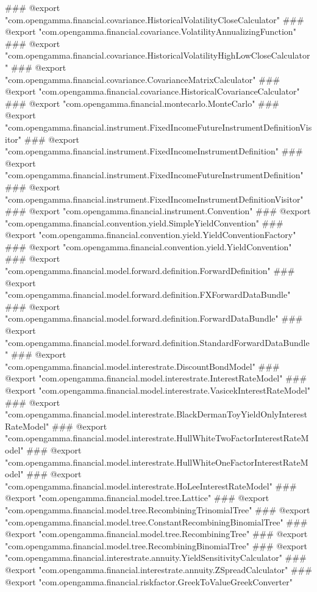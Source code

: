 ### @export "com.opengamma.financial.covariance.HistoricalVolatilityCloseCalculator"
### @export "com.opengamma.financial.covariance.VolatilityAnnualizingFunction"
### @export "com.opengamma.financial.covariance.HistoricalVolatilityHighLowCloseCalculator"
### @export "com.opengamma.financial.covariance.CovarianceMatrixCalculator"
### @export "com.opengamma.financial.covariance.HistoricalCovarianceCalculator"
### @export "com.opengamma.financial.montecarlo.MonteCarlo"
### @export "com.opengamma.financial.instrument.FixedIncomeFutureInstrumentDefinitionVisitor"
### @export "com.opengamma.financial.instrument.FixedIncomeInstrumentDefinition"
### @export "com.opengamma.financial.instrument.FixedIncomeFutureInstrumentDefinition"
### @export "com.opengamma.financial.instrument.FixedIncomeInstrumentDefinitionVisitor"
### @export "com.opengamma.financial.instrument.Convention"
### @export "com.opengamma.financial.convention.yield.SimpleYieldConvention"
### @export "com.opengamma.financial.convention.yield.YieldConventionFactory"
### @export "com.opengamma.financial.convention.yield.YieldConvention"
### @export "com.opengamma.financial.model.forward.definition.ForwardDefinition"
### @export "com.opengamma.financial.model.forward.definition.FXForwardDataBundle"
### @export "com.opengamma.financial.model.forward.definition.ForwardDataBundle"
### @export "com.opengamma.financial.model.forward.definition.StandardForwardDataBundle"
### @export "com.opengamma.financial.model.interestrate.DiscountBondModel"
### @export "com.opengamma.financial.model.interestrate.InterestRateModel"
### @export "com.opengamma.financial.model.interestrate.VasicekInterestRateModel"
### @export "com.opengamma.financial.model.interestrate.BlackDermanToyYieldOnlyInterestRateModel"
### @export "com.opengamma.financial.model.interestrate.HullWhiteTwoFactorInterestRateModel"
### @export "com.opengamma.financial.model.interestrate.HullWhiteOneFactorInterestRateModel"
### @export "com.opengamma.financial.model.interestrate.HoLeeInterestRateModel"
### @export "com.opengamma.financial.model.tree.Lattice"
### @export "com.opengamma.financial.model.tree.RecombiningTrinomialTree"
### @export "com.opengamma.financial.model.tree.ConstantRecombiningBinomialTree"
### @export "com.opengamma.financial.model.tree.RecombiningTree"
### @export "com.opengamma.financial.model.tree.RecombiningBinomialTree"
### @export "com.opengamma.financial.interestrate.annuity.YieldSensitivityCalculator"
### @export "com.opengamma.financial.interestrate.annuity.ZSpreadCalculator"
### @export "com.opengamma.financial.riskfactor.GreekToValueGreekConverter"
